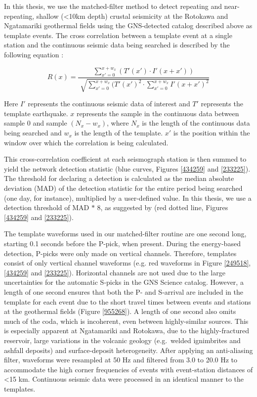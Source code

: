 In this thesis, we use the matched-filter method to detect repeating and near-repeating, shallow (\textless10km depth) crustal seismicity at the Rotokawa and Ngatamariki geothermal fields using the GNS-detected catalog described above as template events. The cross correlation between a template event at a single station and the continuous seismic data being searched is described by the following equation \citep{Chamberlain_2017}:

\begin{equation}
R(x) = \frac{\sum_{x'=0}^{x+w_{x}}(T'(x') \cdot I'(x + x'))}{\sqrt[]{\sum_{x'=0}^{x+w_{x}}(T'(x')^2 \cdot \sum_{x'=0}^{x+w_{x}}I'(x+x')^2}}
\end{equation}

Here $I'$ represents the continuous seismic data of interest and $T'$ represents the template earthquake. $x$ represents the sample in the continuous data between sample $0$ and sample $(N_{x} - w_{x})$, where $N_{x}$ is the length of the continuous data being searched and $w_{x}$ is the length of the template. $x'$ is the position within the window over which the correlation is being calculated.

This cross-correlation coefficient at each seismograph station is then summed to yield the network detection statistic (blue curves, Figures \ref{434259} and \ref{233225}). The threshold for declaring a detection is calculated as the median absolute deviation (MAD) of the detection statistic for the entire period being searched (one day, for instance), multiplied by a user-defined value. In this thesis, we use a detection threshold of MAD $*$ 8, as suggested by \citep{Shelly_2007} (red dotted line, Figures \ref{434259} and \ref{233225}).

The template waveforms used in our matched-filter routine are one second long, starting 0.1 seconds before the P-pick, when present. During the energy-based detection, P-picks were only made on vertical channels. Therefore, templates consist of only vertical channel waveforms (e.g. red waveforms in Figure \ref{249518}, \ref{434259} and \ref{233225}). Horizontal channels are not used due to the large uncertainties for the automatic S-picks in the GNS Science catalog. However, a length of one second ensures that both the P- and S-arrival are included in the template for each event due to the short travel times between events and stations at the geothermal fields (Figure \ref{955268}). A length of one second also omits much of the coda, which is incoherent, even between highly-similar sources. This is especially apparent at Ngatamariki and Rotokawa, due to the highly-fractured reservoir, large variations in the volcanic geology (e.g.\ welded ignimbrites and ashfall deposits) and surface-deposit heterogeneity. After applying an anti-aliasing filter, waveforms were resampled at 50 Hz and filtered from 3.0 to 20.0 Hz to accommodate the high corner frequencies of events with event-station distances of \textless15 km. Continuous seismic data were processed in an identical manner to the templates.

